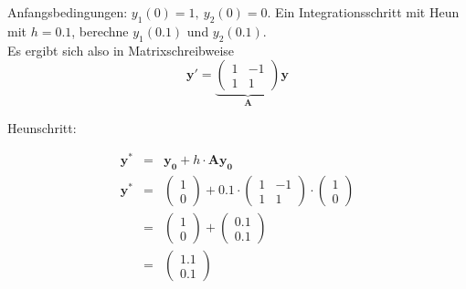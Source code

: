 \documentclass[german, 10pt, a4paper, twocolumn]{scrartcl}
\theoremstyle{definition}
\begin{document}
Anfangsbedingungen: $y_1(0) = 1,\ y_2(0)=0$. Ein Integrationsschritt mit Heun mit $h=0.1$, berechne $y_1(0.1)$ und $y_2(0.1)$.\\

Es ergibt sich also in Matrixschreibweise
\begin{displaymath}
	\mathbf{y}' = \underbrace{ \left (
		\begin{array}{cc}
			1 &	-1\\
			1 &	1
		\end{array}
		\right )
		}_{\mathbf{A}}
		\mathbf{y}
\end{displaymath}

Heunschritt:

\small

\begin{eqnarray*}
	\mathbf{y^*} &	= &	\mathbf{y_0} + h\cdotp \mathbf{A} \mathbf{y_0}\\
	\mathbf{y^*} &	= &	\left (
		\begin{array}{c}
			1\\
			0
		\end{array}
		\right ) + 0.1\cdotp\left (
		\begin{array}{cc}
			1 &	-1\\
			1 &	1
		\end{array} \right )
		\cdotp \left (
		\begin{array}{c}
			1\\
			0
		\end{array}
		\right )\\
	 &	= &	\left (
		\begin{array}{c}
			1\\
			0
		\end{array}
		\right )+
		\left (
		\begin{array}{c}
			0.1\\
			0.1
		\end{array}
		\right )\\
	&	= & 
		\left (
		\begin{array}{c}
			1.1\\
			0.1
		\end{array}
		\right )
\end{eqnarray*}
\end{document}
